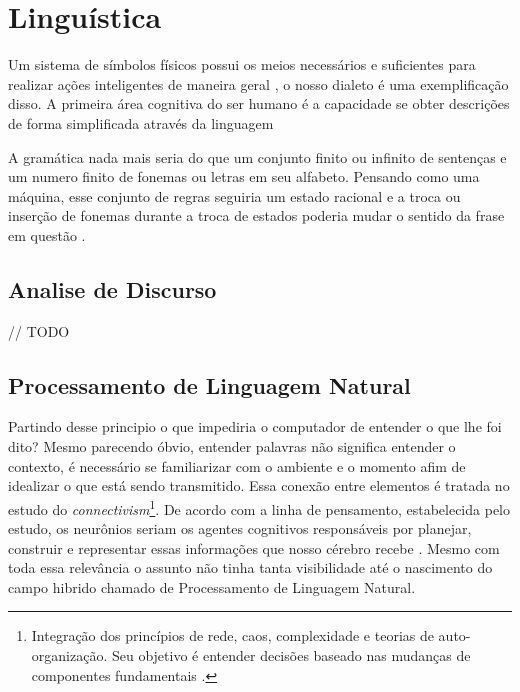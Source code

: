 \section{Linguística}

Um sistema de símbolos físicos possui os meios necessários e suficientes para realizar ações inteligentes de maneira geral \cite[116]{newell1976ComputerSA}, o nosso dialeto é uma exemplificação disso. A primeira área cognitiva do ser humano é a capacidade se obter descrições de forma simplificada através da linguagem \cite[131]{putnam1975mind}

A gramática nada mais seria do que um conjunto finito ou infinito de sentenças e um numero finito de fonemas ou letras em seu alfabeto. Pensando como uma máquina, esse conjunto de regras seguiria um estado racional e a troca ou inserção de fonemas durante a troca de estados poderia mudar o sentido da frase em questão \cite[13-16]{chomsky2002syntactic}.

\subsection{Analise de Discurso}
// TODO

\subsection{Processamento de Linguagem Natural}
Partindo desse principio o que impediria o computador de entender o que lhe foi dito? Mesmo parecendo óbvio, entender palavras não significa entender o contexto, é necessário se familiarizar com o ambiente e o momento afim de idealizar o que está sendo transmitido. Essa conexão entre elementos é tratada no estudo do \textit{connectivism}\footnote{Integração dos princípios de rede, caos, complexidade e teorias de auto-organização. Seu objetivo é entender decisões baseado nas mudanças de componentes fundamentais \cite[5]{siemens2014connectivism}.}. De acordo com a linha de pensamento, estabelecida pelo estudo, os neurônios seriam os agentes cognitivos responsáveis por planejar, construir e representar essas informações que nosso cérebro recebe \cite[22]{brandura1996}. Mesmo com toda essa relevância o assunto não tinha tanta visibilidade até o nascimento  do campo hibrido chamado de Processamento de Linguagem Natural. \cite[16]{russell2003artificial}
